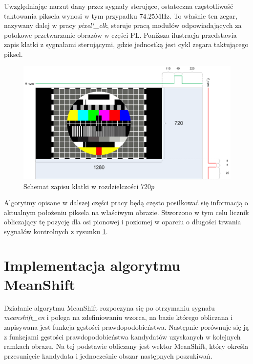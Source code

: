 Uwzględniając narzut dany przez sygnały sterujące, ostateczna częstotliwość taktowania piksela wynosi w tym przypadku $74.25$MHz. 
To właśnie ten zegar, nazywany dalej w pracy \textit{\boldmath pixel\char`_clk}, steruje pracą modułów odpowiadających za potokowe przetwarzanie obrazów w części PL. %
Poniższa ilustracja przedstawia zapis klatki z sygnałami sterującymi, gdzie jednostką jest cykl zegara taktującego piksel. 

\begin{figure}[h]
	\centering
	\includegraphics[width=17cm]{4_720p.png}
	\caption{Schemat zapisu klatki w rozdzielczości $720p$}
	\label{fig:720_frame}
\end{figure}

Algorytmy opisane w dalszej części pracy będą często posiłkować się informacją o aktualnym położeniu piksela na właściwym obrazie. 
Stworzono w tym celu licznik obliczający tę pozycję dla osi pionowej i poziomej w oparciu o długości trwania sygnałów kontrolnych z rysunku \ref{fig:720_frame}. 

 
\section{Implementacja algorytmu MeanShift} %

Działanie algorytmu MeanShift rozpoczyna się po otrzymaniu sygnału \textit{meanshift\_en} i polega na zdefiniowaniu wzorca, na bazie którego obliczana i zapisywana jest funkcja gęstości prawdopodobieństwa. Następnie porównuje się ją z funkcjami gęstości prawdopodobieństwa kandydatów uzyskanych w kolejnych ramkach obrazu. Na tej podstawie obliczany jest wektor MeanShift, który określa przesunięcie kandydata i jednocześnie obszar następnych poszukiwań.

